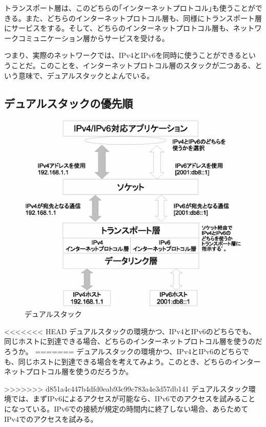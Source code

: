\begin{itemize}
トランスポート層は、このどちらの｢インターネットプロトコル｣も使うことができる。また、どちらのインターネットプロトコル層も、同様にトランスポート層にサービスをする。そして、どちらのインターネットプロトコル層も、ネットワークコミュニケーション層からサービスを受ける。

つまり、実際のネットワークでは、IPv4とIPv6を同時に使うことができるということだ。このことを、インターネットプロトコル層のスタックが二つある、という意味で、デュアルスタックとよんでいる。

\subsection{デュアルスタックの優先順}

\begin{figure}[htbp]
	\includegraphics[width=12cm,clip]{draw/doublebind.eps}
	\caption{デュアルスタック}
	\label{fig:dualstack}
\end{figure}

<<<<<<< HEAD
デュアルスタックの環境かつ、IPv4とIPv6のどちらでも、同じホストに到達できる場合、どちらのインターネットプロトコル層を使うのだろうか。
=======
デュアルスタックの環境かつ、IPv4とIPv6のどちらでも、同じホストに到達できる場合を考えてみよう。このとき、どちらのインターネットプロトコル層を使うのだろうか。

>>>>>>> d851a4c447b4dfd0eab93c99c783a4e3d57db141
デュアルスタック環境では、まずIPv6によるアクセスが可能なら、IPv6でのアクセスを試みることになっている。IPv6での接続が規定の時間内に終了しない場合、あらためてIPv4でのアクセスを試みる。


\end{itemize}
